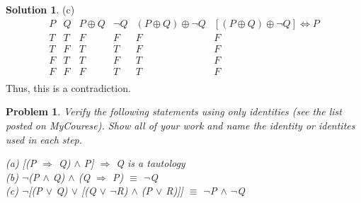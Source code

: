 \documentclass{article}
\newtheorem{problem}{Problem}
\theoremstyle{definition}
\newtheorem*{solution}{Solution}
\begin{document}
\begin{solution}
(c)
\begin{displaymath}
\begin{array}{ c|c|c|c|c|c }
P & Q & P \oplus Q & \neg Q & (P \oplus Q) \oplus \neg Q  & [(P \oplus Q) \oplus \neg Q] \Leftrightarrow P\\ %
\hline %
T & T & F & F & F & F\\
T & F & T & T & F & F\\
F & T & T & F & T & F\\
F & F & F & T & T & F\\
\end{array}
\end{displaymath}
Thus, this is a contradiction.

\break

\end{solution}


\begin{problem}

Verify the following statements using only identities (see the list posted on MyCourese). Show all of your work and name the identity or identites used in each step.

(a) [(P \(\Rightarrow\) Q) \(\wedge\) P] \(\Rightarrow\) Q is a tautology\\

(b) \(\neg\)(P \(\wedge\) Q) \(\wedge\) (Q \(\Rightarrow\) P) \(\equiv\) \(\neg\)Q\\

(c) \(\neg\)[(P \(\vee\) Q) \(\vee\) [(Q \(\vee\) \(\neg\)R) \(\wedge\) (P \(\vee\) R)]] \(\equiv\) \(\neg\)P \(\wedge\) \(\neg\)Q
\\
\\
\end{problem}
\end{document}
